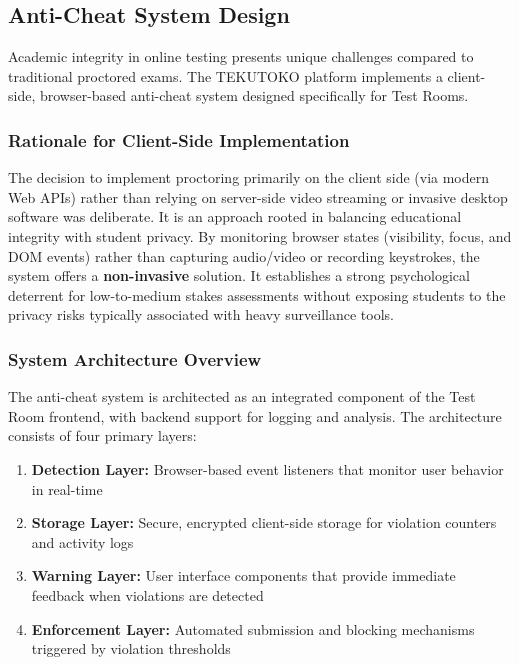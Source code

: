 \FloatBarrier


\subsection{Anti-Cheat System Design}
\label{subsec:anti-cheat-design}

Academic integrity in online testing presents unique challenges compared to traditional proctored exams. The TEKUTOKO platform implements a client-side, browser-based anti-cheat system designed specifically for Test Rooms. 

\subsubsection{Rationale for Client-Side Implementation}
The decision to implement proctoring primarily on the client side (via modern Web APIs) rather than relying on server-side video streaming or invasive desktop software was deliberate. It is an approach rooted in balancing educational integrity with student privacy. By monitoring browser states (visibility, focus, and DOM events) rather than capturing audio/video or recording keystrokes, the system offers a \textbf{non-invasive} solution. It establishes a strong psychological deterrent for low-to-medium stakes assessments without exposing students to the privacy risks typically associated with heavy surveillance tools.

\subsubsection{System Architecture Overview}

The anti-cheat system is architected as an integrated component of the Test Room frontend, with backend support for logging and analysis. The architecture consists of four primary layers:

\begin{enumerate}
    \item \textbf{Detection Layer:} Browser-based event listeners that monitor user behavior in real-time
    \item \textbf{Storage Layer:} Secure, encrypted client-side storage for violation counters and activity logs
    \item \textbf{Warning Layer:} User interface components that provide immediate feedback when violations are detected
    \item \textbf{Enforcement Layer:} Automated submission and blocking mechanisms triggered by violation thresholds
\end{enumerate}

